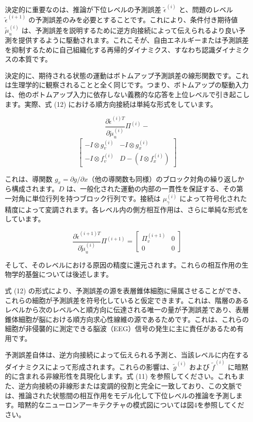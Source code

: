 \documentclass{article}
\begin{document}
決定的に重要なのは、推論が下位レベルの予測誤差 $\tilde{\epsilon}^{(i)}$ と、問題のレベル $\tilde{\epsilon}^{(i+1)}$ の予測誤差のみを必要とすることです。これにより、条件付き期待値 $\tilde{\mu}_u^{(i)}$ は、予測誤差を説明するために逆方向接続によって伝えられるより良い予測を提供するように駆動されます。これこそが、自由エネルギーまたは予測誤差を抑制するために自己組織化する再帰的ダイナミクス、すなわち認識ダイナミクスの本質です。

決定的に、期待される状態の運動はボトムアップ予測誤差の線形関数です。これは生理学的に観察されることと全く同じです。つまり、ボトムアップの駆動入力は、他のボトムアップ入力に依存しない義務的な応答を上位レベルで引き起こします。実際、式 (12) における順方向接続は単純な形式をしています。

$$\frac{\partial\tilde{\epsilon}^{(i)T}}{\partial\tilde{\mu}_u^{(i)}}\varPi^{(i)}-$$
$$\left[
\begin{array}{cc}
-I\otimes g_v^{(i)} & -I\otimes g_x^{(i)} \\
-I\otimes f_v^{(i)} & D-(I\otimes f_x^{(i)})
\end{array}
\right]$$

これは、導関数 $g_x = \partial g/\partial x$（他の導関数も同様）のブロック対角の繰り返しから構成されます。$D$ は、一般化された運動の内部の一貫性を保証する、その第一対角に単位行列を持つブロック行列です。接続は $\mu_\gamma^{(i)}$ によって符号化された精度によって変調されます。各レベル内の側方相互作用は、さらに単純な形式をしています。

$$\frac{\partial\tilde{\epsilon}^{(i+1)T}}{\partial\tilde{\mu}_u^{(i)}}\varPi^{(i+1)}=\left[
\begin{array}{cc}
\varPi_v^{(i+1)} & 0 \\
0 & 0
\end{array}
\right]$$

そして、そのレベルにおける原因の精度に還元されます。これらの相互作用の生物学的基盤については後述します。

式 (12) の形式により、予測誤差の源を表層錐体細胞に帰属させることができ、これらの細胞が予測誤差を符号化していると仮定できます。これは、階層のあるレベルから次のレベルへと順方向に伝達される唯一の量が予測誤差であり、表層錐体細胞が脳における順方向求心性線維の源であるためです。これは、これらの細胞が非侵襲的に測定できる脳波（EEG）信号の発生に主に責任があるため有用です。

予測誤差自体は、逆方向接続によって伝えられる予測と、当該レベルに内在するダイナミクスによって形成されます。これらの影響は、$\tilde{g}^{(i)}$ および $\tilde{f}^{(i)}$ に暗黙的に含まれる非線形性を具現化します。式 (11) を参照してください。これもまた、逆方向接続の非線形または変調的役割と完全に一致しており、この文脈では、推論された状態間の相互作用をモデル化して下位レベルの推論を予測します。暗黙的なニューロンアーキテクチャの模式図については図4を参照してください。
\end{document}
